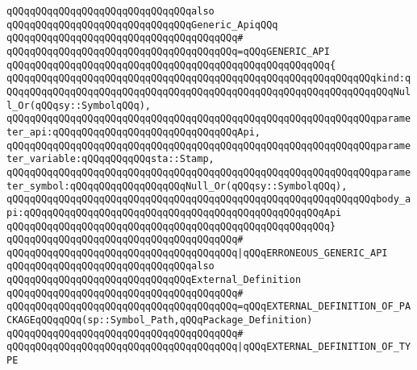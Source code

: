 \newline
\verb|qQQqqQQqqQQqqQQqqQQqqQQqqQQqqQQqalso|\newline
\verb|qQQqqQQqqQQqqQQqqQQqqQQqqQQqqQQqGeneric_ApiqQQq|\newline
\verb|qQQqqQQqqQQqqQQqqQQqqQQqqQQqqQQqqQQqqQQq#|\newline
\verb|qQQqqQQqqQQqqQQqqQQqqQQqqQQqqQQqqQQqqQQq=qQQqGENERIC_API|\newline
\verb|qQQqqQQqqQQqqQQqqQQqqQQqqQQqqQQqqQQqqQQqqQQqqQQqqQQqqQQq{|\newline
\verb|qQQqqQQqqQQqqQQqqQQqqQQqqQQqqQQqqQQqqQQqqQQqqQQqqQQqqQQqqQQqqQQqkind:qQQqqQQqqQQqqQQqqQQqqQQqqQQqqQQqqQQqqQQqqQQqqQQqqQQqqQQqqQQqqQQqqQQqNull_Or(qQQqsy::SymbolqQQq),|\newline
\verb|qQQqqQQqqQQqqQQqqQQqqQQqqQQqqQQqqQQqqQQqqQQqqQQqqQQqqQQqqQQqqQQqparameter_api:qQQqqQQqqQQqqQQqqQQqqQQqqQQqqQQqApi,|\newline
\verb|qQQqqQQqqQQqqQQqqQQqqQQqqQQqqQQqqQQqqQQqqQQqqQQqqQQqqQQqqQQqqQQqparameter_variable:qQQqqQQqqQQqsta::Stamp,|\newline
\verb|qQQqqQQqqQQqqQQqqQQqqQQqqQQqqQQqqQQqqQQqqQQqqQQqqQQqqQQqqQQqqQQqparameter_symbol:qQQqqQQqqQQqqQQqqQQqNull_Or(qQQqsy::SymbolqQQq),|\newline
\verb|qQQqqQQqqQQqqQQqqQQqqQQqqQQqqQQqqQQqqQQqqQQqqQQqqQQqqQQqqQQqqQQqbody_api:qQQqqQQqqQQqqQQqqQQqqQQqqQQqqQQqqQQqqQQqqQQqqQQqqQQqApi|\newline
\verb|qQQqqQQqqQQqqQQqqQQqqQQqqQQqqQQqqQQqqQQqqQQqqQQqqQQqqQQq}|\newline
\verb|qQQqqQQqqQQqqQQqqQQqqQQqqQQqqQQqqQQqqQQq#|\newline
\verb|qQQqqQQqqQQqqQQqqQQqqQQqqQQqqQQqqQQqqQQq|\verb#|qQQqERRONEOUS_GENERIC_API#\newline
\newline
\newline
\newline
\verb|qQQqqQQqqQQqqQQqqQQqqQQqqQQqqQQqalso|\newline
\verb|qQQqqQQqqQQqqQQqqQQqqQQqqQQqqQQqExternal_Definition|\newline
\verb|qQQqqQQqqQQqqQQqqQQqqQQqqQQqqQQqqQQqqQQq#|\newline
\verb|qQQqqQQqqQQqqQQqqQQqqQQqqQQqqQQqqQQqqQQq=qQQqEXTERNAL_DEFINITION_OF_PACKAGEqQQqqQQq(sp::Symbol_Path,qQQqPackage_Definition)|\newline
\verb|qQQqqQQqqQQqqQQqqQQqqQQqqQQqqQQqqQQqqQQq#|\newline
\verb|qQQqqQQqqQQqqQQqqQQqqQQqqQQqqQQqqQQqqQQq|\verb#|qQQqEXTERNAL_DEFINITION_OF_TYPE#\newline
